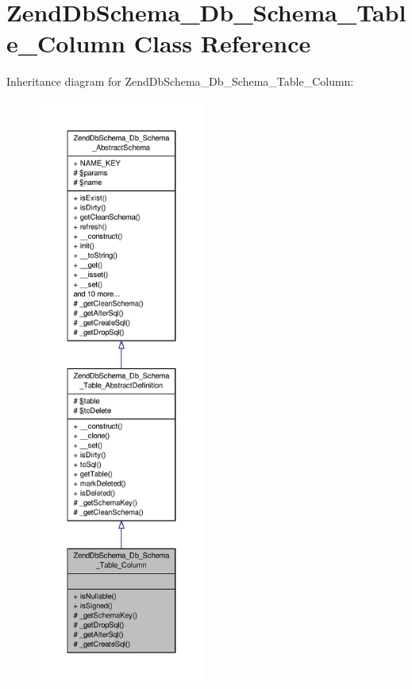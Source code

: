 \hypertarget{classZendDbSchema__Db__Schema__Table__Column}{\section{Zend\-Db\-Schema\-\_\-\-Db\-\_\-\-Schema\-\_\-\-Table\-\_\-\-Column Class Reference}
\label{classZendDbSchema__Db__Schema__Table__Column}
}


Inheritance diagram for Zend\-Db\-Schema\-\_\-\-Db\-\_\-\-Schema\-\_\-\-Table\-\_\-\-Column\-:\nopagebreak
\begin{figure}[H]
\begin{center}
\leavevmode
\includegraphics[height=550pt]{classZendDbSchema__Db__Schema__Table__Column__inherit__graph}
\end{center}
\end{figure}


